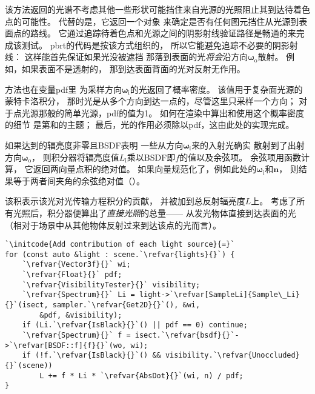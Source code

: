 该方法返回的光谱不考虑其他一些形状可能挡住来自光源的光照阻止其到达待着色点的可能性。
代替的是，它返回一个对象
来确定是否有任何图元挡住从光源到表面点的路线。
它通过追踪待着色点和光源之间的阴影射线验证路径是畅通的来完成该测试。
pbrt的代码是按该方式组织的，
所以它能避免追踪不必要的阴影射线：
这样能首先保证如果光没被遮挡
那落到表面的光\emph{将会}沿方向${\bm \omega}_\mathrm{o}$散射。
例如，如果表面不是透射的，
那到达表面背面的光对反射无作用。

方法也在变量{\ttfamily pdf}里
为采样方向${\bm \omega}_\mathrm{i}$的光返回了概率密度。
该值用于复杂面光源的蒙特卡洛积分，
那时光是从多个方向到达一点的，尽管这里只采样一个方向；
对于点光源那般的简单光源，{\ttfamily pdf}的值为1。
如何在渲染中算出和使用这个概率密度的细节
是第和的主题；
最后，光的作用必须除以{\ttfamily pdf}，这由此处的实现完成。

如果达到的辐亮度非零且BSDF表明
一些从方向${\bm \omega}_\mathrm{i}$来的入射光确实
散射到了出射方向${\bm \omega}_\mathrm{o}$，
则积分器将辐亮度值$L_\mathrm{i}$乘以BSDF即$f$的值以及余弦项。
余弦项用函数计算，
它返回两向量点积的绝对值。
如果向量规范化了，例如此处的${\bm \omega}_\mathrm{i}$和$\bm n$，
则结果等于两者间夹角的余弦绝对值（）。

该积表示该光对光传输方程积分的贡献，
并被加到总反射辐亮度$L$上。
考虑了所有光照后，积分器便算出了\emph{直接光照}的总量——
从发光物体直接到达表面的光
（相对于场景中从其他物体反射过来到达该点的光而言）。

\begin{lstlisting}
`\initcode{Add contribution of each light source}{=}`
for (const auto &light : scene.`\refvar{lights}{}`) {
    `\refvar{Vector3f}{}` wi;
    `\refvar{Float}{}` pdf;
    `\refvar{VisibilityTester}{}` visibility;
    `\refvar{Spectrum}{}` Li = light->`\refvar[SampleLi]{Sample\_Li}{}`(isect, sampler.`\refvar{Get2D}{}`(), &wi,
        &pdf, &visibility);
    if (Li.`\refvar{IsBlack}{}`() || pdf == 0) continue;
    `\refvar{Spectrum}{}` f = isect.`\refvar{bsdf}{}`->`\refvar[BSDF::f]{f}{}`(wo, wi);
    if (!f.`\refvar{IsBlack}{}`() && visibility.`\refvar{Unoccluded}{}`(scene))
        L += f * Li * `\refvar{AbsDot}{}`(wi, n) / pdf;
}
\end{lstlisting}

